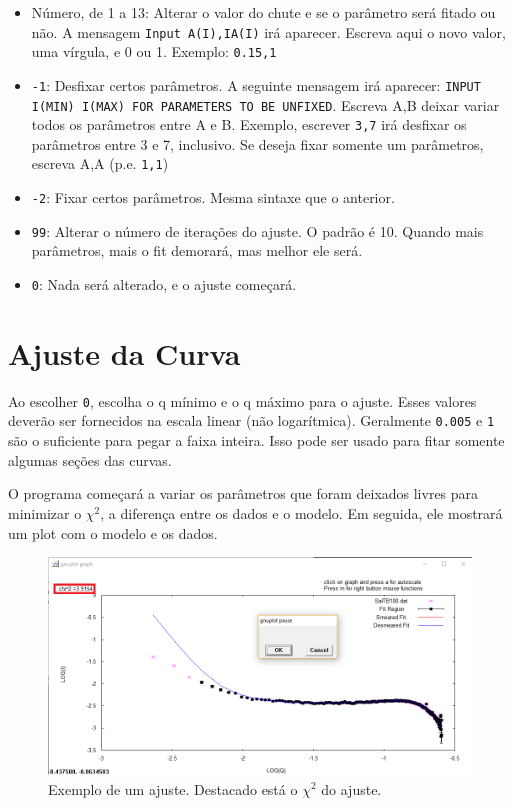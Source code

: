 \begin{apendicesenv}
\begin{itemize}
	\item Número, de 1 a 13: Alterar o valor do chute e se o parâmetro será fitado ou não. A mensagem \texttt{Input A(I),IA(I)} irá aparecer. Escreva aqui o novo valor, uma vírgula, e 0 ou 1. Exemplo: \texttt{0.15,1}
	\item \texttt{-1}: Desfixar certos parâmetros. A seguinte mensagem irá aparecer: \texttt{INPUT I(MIN) I(MAX) FOR PARAMETERS TO BE UNFIXED}. Escreva A,B deixar variar todos os parâmetros entre A e B. Exemplo, escrever \texttt{3,7} irá desfixar os parâmetros entre 3 e 7, inclusivo. Se deseja fixar somente um parâmetros, escreva A,A (p.e. \texttt{1,1})
	\item \texttt{-2}: Fixar certos parâmetros. Mesma sintaxe que o anterior.
	\item \texttt{99}: Alterar o número de iterações do ajuste. O padrão é 10. Quando mais parâmetros, mais o fit demorará, mas melhor ele será.
	\item \texttt{0}: Nada será alterado, e o ajuste começará.
\end{itemize}

\section{Ajuste da Curva}
Ao escolher \texttt{0}, escolha o q mínimo e o q máximo para o ajuste. Esses valores deverão ser fornecidos na escala linear (não logarítmica). Geralmente \texttt{0.005} e \texttt{1} são o suficiente para pegar a faixa inteira. Isso pode ser usado para fitar somente algumas seções das curvas.

O programa começará a variar os parâmetros que foram deixados livres para minimizar o \(\chi^2\), a diferença entre os dados e o modelo. Em seguida, ele mostrará um plot com o modelo e os dados.

\begin{figure}[h]
	\centering
	\includegraphics[scale=0.5]{./imagens/saxs/supersaxs_gnuplot_fit}
	\caption{Exemplo de um ajuste. Destacado está o \(\chi^2\) do ajuste.}
\end{figure}


\end{apendicesenv}
